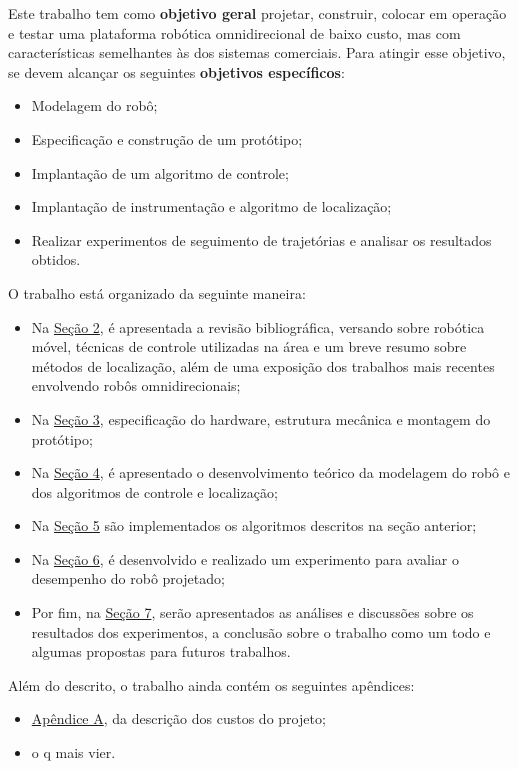 
Este trabalho tem como \textbf{objetivo geral} projetar, construir, colocar em operação e testar uma plataforma robótica omnidirecional de baixo custo, mas com características semelhantes às dos sistemas comerciais. Para atingir esse objetivo, se devem alcançar os seguintes \textbf{objetivos específicos}:

\begin{itemize}
  \item{Modelagem do robô;} %
  \item{Especificação e construção de um protótipo;}
  \item{Implantação de um algoritmo de controle;} %
  \item{Implantação de instrumentação e algoritmo de localização;}
  \item{Realizar experimentos de seguimento de trajetórias e analisar os resultados obtidos.}
\end{itemize}


O trabalho está organizado da seguinte maneira:
\begin{itemize}
  \item{Na \hyperref[sec:revbib]{Seção 2}, é apresentada a revisão bibliográfica, versando sobre robótica móvel, técnicas de controle utilizadas na área e um breve resumo sobre métodos de localização, além de uma exposição dos trabalhos mais recentes envolvendo robôs omnidirecionais;} %
  \item{Na \hyperref[sec:montagem]{Seção 3}, especificação do hardware, estrutura mecânica e montagem do protótipo;}
  \item{Na \hyperref[sec:teorico]{Seção 4}, é apresentado o desenvolvimento teórico da modelagem do robô e dos algoritmos de controle e localização;}
  \item{Na \hyperref[sec:software]{Seção 5} são implementados os algoritmos descritos na seção anterior;}
  \item{Na \hyperref[sec:experimental]{Seção 6}, é desenvolvido e realizado um experimento para avaliar o desempenho do robô projetado;}
  \item{Por fim, na \hyperref[sec:resultados]{Seção 7}, serão apresentados as análises e discussões sobre os resultados dos experimentos, a conclusão sobre o trabalho como um todo e algumas propostas para futuros trabalhos.}
\end{itemize}

Além do descrito, o trabalho ainda contém os seguintes apêndices:
\begin{itemize}
  \item{\hyperref[sec:custo]{Apêndice A}, da descrição dos custos do projeto;}
  \item{o q mais vier.}
\end{itemize}
